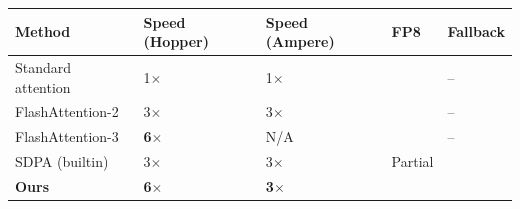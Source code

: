 \begin{table}[H]
\centering
\small
\begin{tabular}{lllll}
\toprule
\textbf{Method} & \textbf{Speed (Hopper)} & \textbf{Speed (Ampere)} & \textbf{FP8} & \textbf{Fallback} \\
\midrule
Standard attention & 1$\times$ & 1$\times$ &  & -- \\
FlashAttention-2 & 3$\times$ & 3$\times$ &  & -- \\
FlashAttention-3 & \textbf{6$\times$} & N/A &  & -- \\
SDPA (builtin) & 3$\times$ & 3$\times$ & Partial &  \\
\textbf{Ours} & \textbf{6$\times$} & \textbf{3$\times$} &  &  \\
\bottomrule
\end{tabular}
\end{table}

